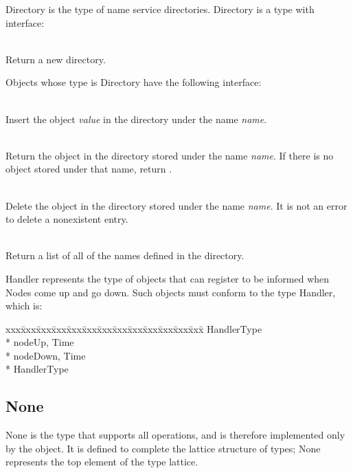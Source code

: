Directory is the type of name service directories.  Directory is a type with
interface:
\begin{desc}
  \item[\kw{operation} create \returns{} \/\LB{}r \CO{} Directory\/\RB{}]~\\
    Return a new directory.
\end{desc}

\noindent Objects whose type is Directory have the following
interface:

\begin{desc}
  \item[\kw{operation} insert\/\LB{}name \CO{} \tn{String}, value \CO{} \tn{Any}\/\RB{}]~\\
    Insert the object {\it value} in the directory under the name {\it name}.
  \item[\kw{function} lookup\/\LB{}name \CO{} \tn{String}\/\RB{} \returns{} \/\LB{}\tn{Any}\/\RB{}]~\\
    Return the object in the directory stored under the name {\it name}.  If
    there is no object stored under that name, return .
  \item[\kw{operation} delete\/\LB{}\tn{String}\/\RB{}]~\\
    Delete the object in the directory stored under the name {\it name}.
    It is not an error to delete a nonexistent entry.
  \item[\kw{function} list \returns{} \/\LB{}ImmutableVectorOfString\/\RB{}]~\\
    Return a list of all of the names defined in the directory.
\end{desc}

Handler represents the type of objects that can register to be informed when
Nodes come up and go down.  Such objects must conform to the type Handler,
which is:

{\it\begin{minipage}{\textwidth}\begin{tabbing}
xxx\=xxx\=xxx\=xxx\=xxx\=xxx\=xxx\=xxx\=xxx\=xxx\=xxx\=xxx\=xxx\=\+\kill%
 HandlerType\+\\*{}%
   nodeUp\/\LB{}, Time\/\RB{}\\*{}%
   nodeDown\/\LB{}, Time\/\RB{}\-\\*{}%
 HandlerType
\end{tabbing}\end{minipage}}

\subsection{None}
\label{builtin None}
None is the type that supports all operations, and is therefore
implemented only by the  object.  It is defined to complete the
lattice structure of \emd{} types; None represents the top element of the
type lattice.


